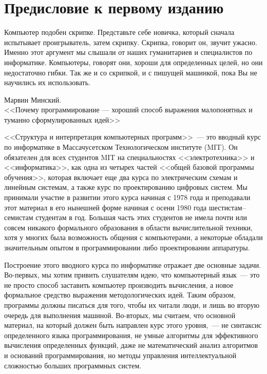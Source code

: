 \chapter*{Предисловие к первому изданию}
\thispagestyle{empty}
\epigraph
{Компьютер подобен скрипке. Представьте себе новичка,
который сначала испытывает проигрыватель, затем скрипку. Скрипка,
говорит он, звучит ужасно.  Именно этот аргумент мы слышали от наших
гуманитариев и специалистов по информатике. Компьютеры, говорят они,
хороши для определенных целей, но они недостаточно гибки.  Так же и 
со скрипкой, и с пишущей машинкой, пока Вы не научились их
использовать.
}
{Марвин Минский.\\
<<Почему программирование --- хороший способ
выражения малопонятных и туманно сформулированных идей>>}

<<Структура и интерпретация компьютерных программ>>~--- это
вводный курс по информатике в Массачусетском Технологическом
институте (MIT).  Он обязателен для всех студентов MIT на
специальностях <<электротехника>> и <<информатика>>, как одна из четырех частей
<<общей базовой программы обучения>>, которая включает еще два курса по
электрическим схемам и линейным системам, а также курс по
проектированию цифровых систем.  Мы принимали участие в развитии этого 
курса начиная с 1978 года и преподавали этот материал в его
нынешней форме начиная с осени 1980 года шестистам--семистам студентам в
год.  Большая часть этих студентов не имела почти или совсем никакого
формального образования в области вычислительной техники, хотя у многих была возможность 
общения с компьютерами, а некоторые обладали значительным опытом в
программировании либо проектировании аппаратуры.

Построение этого вводного курса по информатике отражает 
две основные задачи.  Во-первых, мы хотим привить слушателям идею, 
что компьютерный язык~--- это не просто способ заставить компьютер
производить вычисления, а новое формальное средство выражения 
методологических идей.  Таким образом, программы должны писаться для
того, чтобы их читали люди, и лишь во вторую очередь для выполнения машиной.
Во-вторых, мы считаем, что основной материал, на который должен быть
направлен курс этого уровня,~--- не синтаксис определенного языка
программирования, не умные алгоритмы для эффективного вычисления
определенных функций, даже не математический анализ алгоритмов и
оснований программирования, но методы управления интеллектуальной
сложностью больших программных систем.

